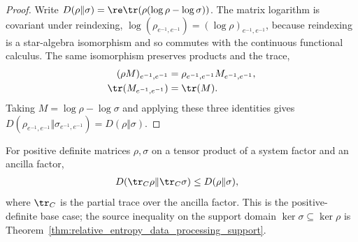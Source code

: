\begin{proof}\leanok
    Write
    $D(\rho\Vert\sigma)
        =\re\tr(\rho(\log\rho-\log\sigma))$.
    The matrix logarithm is covariant under reindexing,
    $\log(\rho_{e^{-1},e^{-1}})
        =(\log\rho)_{e^{-1},e^{-1}}$, because reindexing is a
    star-algebra isomorphism and so commutes with the continuous functional
    calculus. The same isomorphism preserves products and the trace,
    \begin{align}
        (\rho M)_{e^{-1},e^{-1}}
         & =\rho_{e^{-1},e^{-1}}M_{e^{-1},e^{-1}},
        \notag                                     \\
        \tr(M_{e^{-1},e^{-1}})
         & =\tr(M).
        \notag
    \end{align}
    Taking $M=\log\rho-\log\sigma$ and applying these three identities gives
    $D(\rho_{e^{-1},e^{-1}}\Vert\sigma_{e^{-1},e^{-1}})
        =D(\rho\Vert\sigma)$.
\end{proof}

\begin{theorem}
    \label{thm:relative_entropy_data_processing}
    \leanok
    For positive definite matrices $\rho,\sigma$ on a tensor product of a system
    factor and an ancilla factor,
    \begin{align}
        D(\tr_C\rho\Vert\tr_C\sigma)
         & \le D(\rho\Vert\sigma),
        \label{eq:entropy_data_processing}
    \end{align}
    where $\tr_C$ is the partial trace over the ancilla factor. This is the
    positive-definite base case; the source inequality on the support domain
    $\ker\sigma\subseteq\ker\rho$ is
    Theorem~\ref{thm:relative_entropy_data_processing_support}.
\end{theorem}

